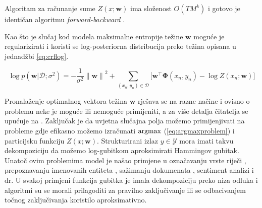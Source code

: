 Algoritam za računanje sume $Z(x; \mathbf{w})$ ima složenost $O(T M ^ k)$ i
gotovo je identičan algoritmu \textit{forward-backward}
\citep{baum1966statistical}.

Kao što je slučaj kod modela maksimalne entropije težine $\mathbf{w}$ moguće je
regularizirati i koristi se log-posteriorna distribucija preko težina opisana u
jednadžbi \ref{eq:crflog}.

\begin{equation}\label{eq:crflog}
  \log p(\mathbf{w} | \mathcal{D}; \sigma^2) = -\frac{1}{\sigma^2} {\lVert\mathbf{w}\lVert}^2 + \sum_{(x_n, y_n) \in \mathcal{D}} \bigg[ \mathbf{w}^\top \mathbf{\Phi}(x_n, y_n) - \log Z(x_n; \mathbf{w}) \bigg]
\end{equation}

\noindent
Pronalaženje optimalnog vektora težina $\mathbf{w}$ rješava se na razne načine
\citep{lafferty2001conditional, sha2003shallow, sokolovska2010efficient} i
ovisno o problemu neke je moguće ili nemoguće primijeniti, a za više detalja
čitatelja se upućuje na \citep{wallach2004conditional, sutton2006introduction}.
Zaključak je da uvjetna slučajna polja možemo primijenjivati na probleme gdje
efikasno možemo izračunati $\operatorname*{argmax}$ (\ref{eq:argmaxproblem}) i particijsku
funkciju $Z(x; \mathbf{w})$. Strukturirani izlaz $y \in \mathcal{Y}$ mora imati
takvu dekompoziciju da možemo log-gubitkom aproksimirati Hammingov gubitak.
Unatoč ovim problemima model je našao primjene u označavanju vrste riječi
\citep{lafferty2001conditional}, prepoznavanju imenovanih entiteta
\citep{mccallum2003early, settles2004biomedical}, sažimanju dokumenata
 \citep{shen2007document}, sentiment analizi
\citep{mcdonald2007structured} i dr. U svakoj primjeni funkcija gubitka je imala
dekompoziciju preko niza odluka i algoritmi su se morali prilagoditi za pravilno
zaključivanje ili se odbacivanjem točnog zaključivanja koristilo aproksimativno.

